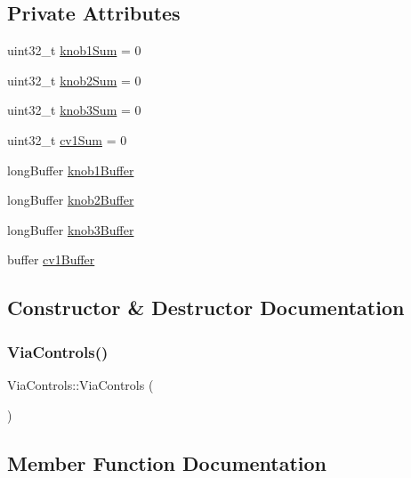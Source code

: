 \subsection*{Private Attributes}
\begin{DoxyCompactItemize}
\item 
uint32\+\_\+t \mbox{\hyperlink{class_via_controls_ad10c0b5e7648d8bf972da147a2da0c35}{knob1\+Sum}} = 0
\item 
uint32\+\_\+t \mbox{\hyperlink{class_via_controls_ae50045ca6b669d5507fb67bcc29d11fe}{knob2\+Sum}} = 0
\item 
uint32\+\_\+t \mbox{\hyperlink{class_via_controls_a4e833af5a829de5cdd6af873aa8f7c76}{knob3\+Sum}} = 0
\item 
uint32\+\_\+t \mbox{\hyperlink{class_via_controls_a4d9edb62f9a1ee804db2c3c95549cd6a}{cv1\+Sum}} = 0
\item 
long\+Buffer \mbox{\hyperlink{class_via_controls_aa9dcc2548b1fba759a874b8310b35d8a}{knob1\+Buffer}}
\item 
long\+Buffer \mbox{\hyperlink{class_via_controls_a8394ea9cd19286fafdab735286b03457}{knob2\+Buffer}}
\item 
long\+Buffer \mbox{\hyperlink{class_via_controls_ad2558a3ac17bb86e03f13dba6a0b7098}{knob3\+Buffer}}
\item 
buffer \mbox{\hyperlink{class_via_controls_af71248b90673ef5c06056d19124de3d8}{cv1\+Buffer}}
\end{DoxyCompactItemize}


\subsection{Constructor \& Destructor Documentation}
\mbox{\label{class_via_controls_a4aabf655d70aee7d8f2b7089182eeea8}} 
\subsubsection{\texorpdfstring{Via\+Controls()}{ViaControls()}}
{\footnotesize\ttfamily Via\+Controls\+::\+Via\+Controls (\begin{DoxyParamCaption}{ }\end{DoxyParamCaption})\hspace{0.3cm}{\ttfamily [inline]}}



\subsection{Member Function Documentation}
\mbox{\label{class_via_controls_a49ffb416e7453065a788408886977910}} 
